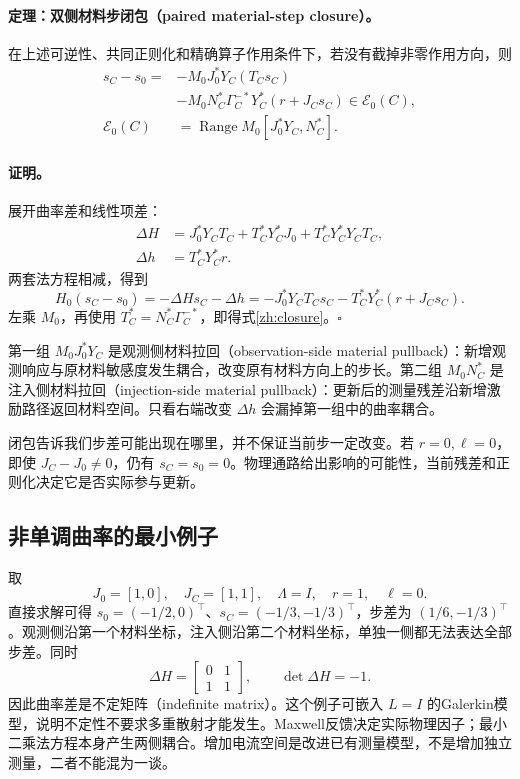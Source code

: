 \paragraph{定理：双侧材料步闭包（paired material-step closure）。}
在上述可逆性、共同正则化和精确算子作用条件下，若没有截掉非零作用方向，则
\begin{equation}\label{zh:closure}
 \begin{aligned}
 s_C-s_0={}&-M_0J_0^*Y_C(T_Cs_C)\\
 &-M_0N_C^*\Gamma_C^{-*}Y_C^*(r+J_Cs_C)
 \in\mathcal E_0(C),\\
 \mathcal E_0(C)&=\operatorname{Range}M_0[J_0^*Y_C,N_C^*].
 \end{aligned}
\end{equation}
\paragraph{证明。}
展开曲率差和线性项差：
\begin{equation}
 \begin{aligned}
 \Delta H&=J_0^*Y_CT_C+T_C^*Y_C^*J_0+T_C^*Y_C^*Y_CT_C,\\
 \Delta h&=T_C^*Y_C^*r.
 \end{aligned}
\end{equation}
两套法方程相减，得到
\begin{equation}
 H_0(s_C-s_0)=-\Delta Hs_C-\Delta h
 =-J_0^*Y_CT_Cs_C-T_C^*Y_C^*(r+J_Cs_C).
\end{equation}
左乘 $M_0$，再使用 $T_C^*=N_C^*\Gamma_C^{-*}$，即得式\eqref{zh:closure}。\hfill$\square$

第一组 $M_0J_0^*Y_C$ 是观测侧材料拉回（observation-side material pullback）：新增观测响应与原材料敏感度发生耦合，改变原有材料方向上的步长。第二组 $M_0N_C^*$ 是注入侧材料拉回（injection-side material pullback）：更新后的测量残差沿新增激励路径返回材料空间。只看右端改变 $\Delta h$ 会漏掉第一组中的曲率耦合。

闭包告诉我们步差可能出现在哪里，并不保证当前步一定改变。若 $r=0,\ell=0$，即使 $J_C-J_0\ne0$，仍有 $s_C=s_0=0$。物理通路给出影响的可能性，当前残差和正则化决定它是否实际参与更新。

\subsection{非单调曲率的最小例子}
取
\begin{equation}
 J_0=[1,0],\quad J_C=[1,1],\quad\Lambda=I,\quad r=1,\quad\ell=0.
\end{equation}
直接求解可得 $s_0=(-1/2,0)^\top$、$s_C=(-1/3,-1/3)^\top$，步差为 $(1/6,-1/3)^\top$。观测侧沿第一个材料坐标，注入侧沿第二个材料坐标，单独一侧都无法表达全部步差。同时
\begin{equation}
 \Delta H=\begin{bmatrix}0&1\\1&1\end{bmatrix},\qquad\det\Delta H=-1.
\end{equation}
因此曲率差是不定矩阵（indefinite matrix）。这个例子可嵌入 $L=I$ 的Galerkin模型，说明不定性不要求多重散射才能发生。Maxwell反馈决定实际物理因子；最小二乘法方程本身产生两侧耦合。增加电流空间是改进已有测量模型，不是增加独立测量，二者不能混为一谈。

